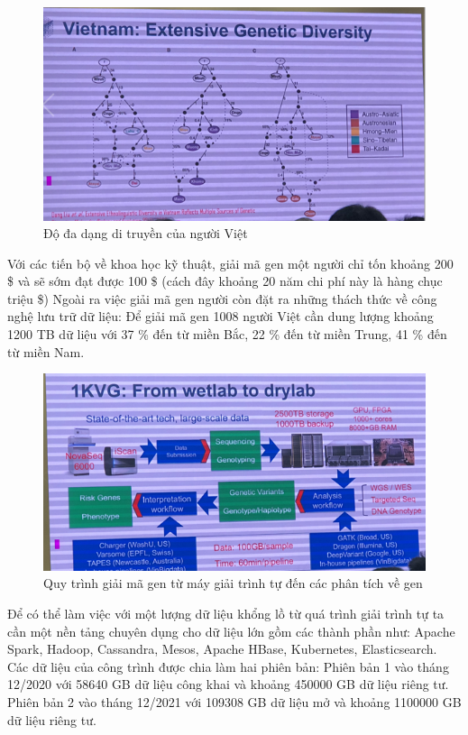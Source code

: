 \documentclass[14pt, a4paper]{article}
\numberwithin{equation}{section}
\numberwithin{figure}{section}
\numberwithin{dl}{section}
\numberwithin{md}{section}
\numberwithin{bd}{section}
\numberwithin{dn}{section}
\numberwithin{hq}{section}
\begin{document}
    \begin{figure}[h!]
        \centering
        \includegraphics[scale=0.8]{Vietnam_Extensive_Genetic_Diversity.png}
        \caption{Độ đa dạng di truyền của người Việt}
    \end{figure}

    Với các tiến bộ về khoa học kỹ thuật, giải mã gen một người chỉ tốn khoảng 200 \$ và sẽ sớm đạt được 100 \$ (cách đây khoảng 20 năm chi phí này là hàng chục triệu \$)
    Ngoài ra việc giải mã gen người còn đặt ra những thách thức về công nghệ lưu trữ dữ liệu: Để giải mã gen 1008 người Việt cần dung lượng khoảng 1200 TB dữ liệu với 37 \% đến từ miền Bắc, 22 \% đến từ miền Trung, 41 \% đến từ miền Nam.
    
    \begin{figure}[h!]
        \centering
        \includegraphics[scale=0.8]{Wetlab_to_Drylab.png}
        \caption{Quy trình giải mã gen từ máy giải trình tự đến các phân tích về gen}
    \end{figure}

    Để có thể làm việc với một lượng dữ liệu khổng lồ từ quá trình giải trình tự ta cần một nền tảng chuyên dụng cho dữ liệu lớn gồm các thành phần như: Apache Spark, Hadoop, Cassandra, Mesos, Apache HBase, Kubernetes, Elasticsearch.
    Các dữ liệu của công trình được chia làm hai phiên bản: Phiên bản 1 vào tháng 12/2020 với 58640 GB dữ liệu công khai và khoảng 450000 GB dữ liệu riêng tư. Phiên bản 2 vào tháng 12/2021 với 109308 GB dữ liệu mở và khoảng 1100000 GB dữ liệu riêng tư.
\end{document}
